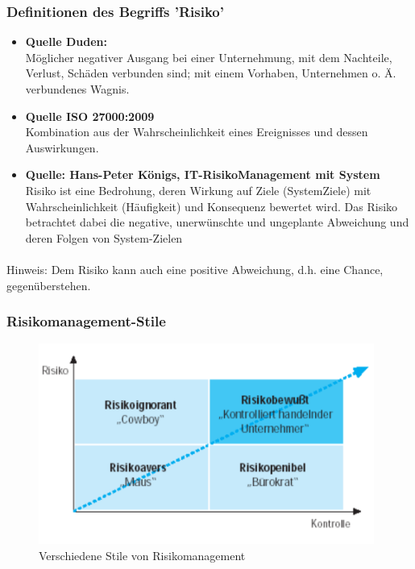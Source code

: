 \documentclass[10pt,a4paper]{article}
\begin{document}
\subsubsection*{Definitionen des Begriffs 'Risiko'}
\begin{itemize}[noitemsep,topsep=0pt,leftmargin=*]
    \item \textbf{Quelle Duden:} \\ Möglicher negativer Ausgang bei einer Unternehmung, mit
    dem Nachteile, Verlust, Schäden verbunden sind; mit einem
    Vorhaben, Unternehmen o. Ä. verbundenes Wagnis.
    \item \textbf{Quelle ISO 27000:2009} \\ Kombination aus der Wahrscheinlichkeit eines Ereignisses und
    dessen Auswirkungen.
    \item \textbf{Quelle: Hans-Peter Königs, IT-RisikoManagement mit System} \\Risiko ist eine Bedrohung, deren Wirkung auf Ziele (SystemZiele) mit Wahrscheinlichkeit (Häufigkeit) und Konsequenz
    bewertet wird. Das Risiko betrachtet dabei die negative,
    unerwünschte und ungeplante Abweichung und deren Folgen
    von System-Zielen
\end{itemize}
\paragraph*{}Hinweis: Dem Risiko kann auch eine positive Abweichung, d.h. eine Chance, gegenüberstehen.

\subsubsection*{Risikomanagement-Stile}
\begin{figure}[H]
    \begin{center}
    \includegraphics[width=11cm]{images/KPMG_Risikomanagementstile.png}
    \caption{Verschiedene Stile von Risikomanagement}
    \label{risikomanagementstile}
    \end{center}
\end{figure}
\end{document}
